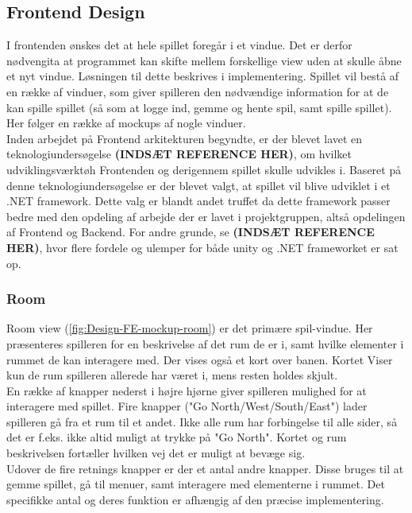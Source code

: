 \subsection{Frontend Design}

I frontenden ønskes det at hele spillet foregår i et vindue. Det er derfor nødvengita at programmet kan skifte mellem forskellige view uden at skulle åbne et nyt vindue. Løsningen til dette beskrives i implementering.
Spillet vil bestå af en række af vinduer, som giver spilleren den nødvændige information for at de kan spille spillet (så som at logge ind, gemme og hente spil, samt spille spillet). Her følger en række af mockups af nogle vinduer.\\ 
Inden arbejdet på Frontend arkitekturen begyndte, er der blevet lavet en teknologiundersøgelse \textbf{(INDSÆT REFERENCE HER)}, om hvilket udviklingsværktøh Frontenden og derigennem spillet skulle udvikles i. Baseret på denne teknologiundersøgelse er der blevet valgt, at spillet vil blive udviklet i et .NET framework. Dette valg er blandt andet truffet da dette framework passer bedre med den opdeling af arbejde der er lavet i projektgruppen, altså opdelingen af Frontend og Backend. For andre grunde, se \textbf{(INDSÆT REFERENCE HER)}, hvor flere fordele og ulemper for både unity og .NET frameworket er sat op.


\subsubsection{Room}

Room view (\autoref{fig:Design-FE-mockup-room}) er det primære spil-vindue. Her præsenteres spilleren for en beskrivelse af det rum de er i, samt hvilke elementer i rummet de kan interagere med. Der vises også et kort over banen. Kortet Viser kun de rum spilleren allerede har været i, mens resten holdes skjult.\\
En række af knapper nederst i højre hjørne giver spilleren mulighed for at interagere med spillet. Fire knapper ("Go {North/West/South/East}") lader spilleren gå fra et rum til et andet. Ikke alle rum har forbingelse til alle sider, så det er f.eks. ikke altid muligt at trykke på "Go North". Kortet og rum beskrivelsen fortæller hvilken vej det er muligt at bevæge sig.\\
Udover de fire retnings knapper er der et antal andre knapper. Disse bruges til at gemme spillet, gå til menuer, samt interagere med elementerne i rummet. Det specifikke antal og deres funktion er afhængig af den præcise implementering.

